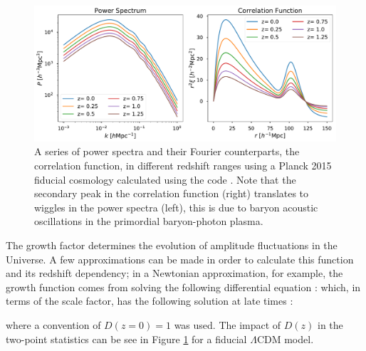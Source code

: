 \begin{figure}
\begin{center}
\includegraphics[width=\textwidth]{Intro-FIGS/Pk_Cf}
\caption[Power spectra and correlation functions calculated using the \class code.]{A series of power spectra and their Fourier counterparts, the correlation function, in different redshift ranges using a Planck 2015 fiducial cosmology \citep{PlanckResults2015} calculated using the \class code \citep{Class}. Note that the secondary peak in the correlation function (right) translates to wiggles in the power spectra (left), this is due to baryon acoustic oscillations in the primordial baryon-photon plasma.}
\label{fig:Pk_Cf}
\end{center}
\end{figure}

\qquad The growth factor determines the evolution of amplitude fluctuations in the Universe. A few approximations can be made in order to calculate this function and its redshift dependency; in a Newtonian approximation, for example, the growth function comes from solving the following differential equation \citep[][p. 345]{schneider_2016}:
which, in terms of the scale factor, has the following solution at late times \citep[][pages 206 and 345, respectively]{dods,schneider_2016}:


where a convention of $D(z=0)=1$ was used. The impact of $D(z)$ in the two-point statistics can be see in Figure \ref{fig:Pk_Cf} for a fiducial $\Lambda$CDM model.


